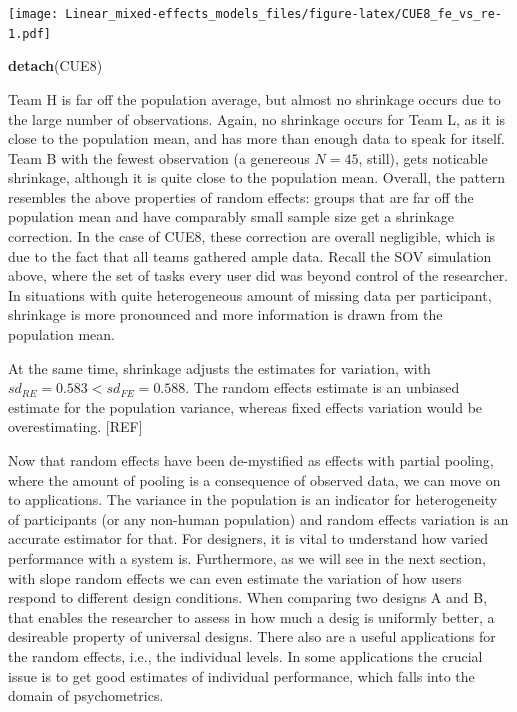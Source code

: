 \documentclass[]{svmono}
\newenvironment{Shaded}{\begin{snugshade}}{\end{snugshade}}
\newcommand{\KeywordTok}[1]{\textcolor[rgb]{0.13,0.29,0.53}{\textbf{#1}}}
\newcommand{\NormalTok}[1]{#1}
\theoremstyle{definition}
\theoremstyle{definition}
\theoremstyle{definition}
\theoremstyle{remark}
\begin{document}
\texttt{[image: Linear\_mixed-effects\_models\_files/figure-latex/CUE8\_fe\_vs\_re-1.pdf]}

\begin{Shaded}
\begin{Highlighting}[]
\KeywordTok{detach}\NormalTok{(CUE8)}
\end{Highlighting}
\end{Shaded}

Team H is far off the population average, but almost no shrinkage occurs
due to the large number of observations. Again, no shrinkage occurs for
Team L, as it is close to the population mean, and has more than enough
data to speak for itself. Team B with the fewest observation (a
genereous \(N = 45\), still), gets noticable shrinkage, although it is
quite close to the population mean. Overall, the pattern resembles the
above properties of random effects: groups that are far off the
population mean and have comparably small sample size get a shrinkage
correction. In the case of CUE8, these correction are overall
negligible, which is due to the fact that all teams gathered ample data.
Recall the SOV simulation above, where the set of tasks every user did
was beyond control of the researcher. In situations with quite
heterogeneous amount of missing data per participant, shrinkage is more
pronounced and more information is drawn from the population mean.

At the same time, shrinkage adjusts the estimates for variation, with
\(sd_{RE} = 0.583 < sd_{FE} = 0.588\). The random effects estimate is an
unbiased estimate for the population variance, whereas fixed effects
variation would be overestimating. {[}REF{]}

Now that random effects have been de-mystified as effects with partial
pooling, where the amount of pooling is a consequence of observed data,
we can move on to applications. The variance in the population is an
indicator for heterogeneity of participants (or any non-human
population) and random effects variation is an accurate estimator for
that. For designers, it is vital to understand how varied performance
with a system is. Furthermore, as we will see in the next section, with
slope random effects we can even estimate the variation of how users
respond to different design conditions. When comparing two designs A and
B, that enables the researcher to assess in how much a desig is
uniformly better, a desireable property of universal designs. There also
are a useful applications for the random effects, i.e., the individual
levels. In some applications the crucial issue is to get good estimates
of individual performance, which falls into the domain of psychometrics.
\end{document}
